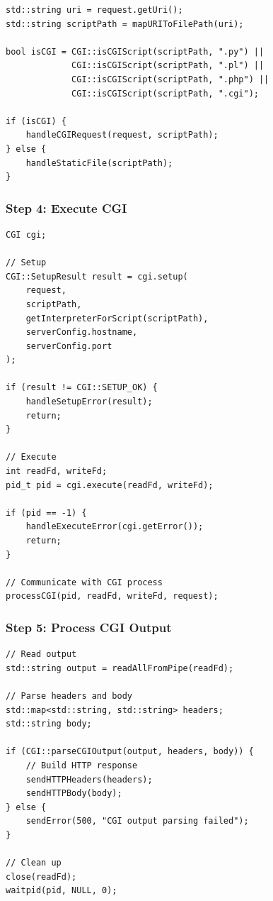 \documentclass[11pt,a4paper]{article}
\begin{document}
\begin{lstlisting}[caption=CGI Detection]
std::string uri = request.getUri();
std::string scriptPath = mapURIToFilePath(uri);

bool isCGI = CGI::isCGIScript(scriptPath, ".py") ||
             CGI::isCGIScript(scriptPath, ".pl") ||
             CGI::isCGIScript(scriptPath, ".php") ||
             CGI::isCGIScript(scriptPath, ".cgi");

if (isCGI) {
    handleCGIRequest(request, scriptPath);
} else {
    handleStaticFile(scriptPath);
}
\end{lstlisting}

\subsubsection{Step 4: Execute CGI}

\begin{lstlisting}[caption=CGI Execution]
CGI cgi;

// Setup
CGI::SetupResult result = cgi.setup(
    request,
    scriptPath,
    getInterpreterForScript(scriptPath),
    serverConfig.hostname,
    serverConfig.port
);

if (result != CGI::SETUP_OK) {
    handleSetupError(result);
    return;
}

// Execute
int readFd, writeFd;
pid_t pid = cgi.execute(readFd, writeFd);

if (pid == -1) {
    handleExecuteError(cgi.getError());
    return;
}

// Communicate with CGI process
processCGI(pid, readFd, writeFd, request);
\end{lstlisting}

\subsubsection{Step 5: Process CGI Output}

\begin{lstlisting}[caption=Output Processing]
// Read output
std::string output = readAllFromPipe(readFd);

// Parse headers and body
std::map<std::string, std::string> headers;
std::string body;

if (CGI::parseCGIOutput(output, headers, body)) {
    // Build HTTP response
    sendHTTPHeaders(headers);
    sendHTTPBody(body);
} else {
    sendError(500, "CGI output parsing failed");
}

// Clean up
close(readFd);
waitpid(pid, NULL, 0);
\end{lstlisting}
\end{document}

